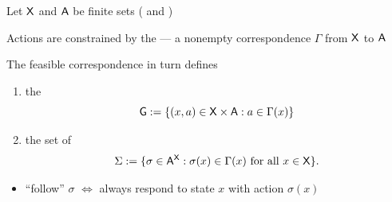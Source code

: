 \begin{frame}
    
    Let $\mathsf X$ and $\mathsf A$ be finite sets ( and )

        \vspace{0.5em}
    Actions are constrained by the  ---
        a nonempty correspondence $\Gamma$ from $\mathsf X$ to $\mathsf A$ 
            

        \vspace{0.5em}

    The feasible correspondence in turn defines
    \begin{enumerate}
        \item the 
            \begin{equation*}
                \mathsf G := \{ (x, a) \in \mathsf X \times \mathsf A : a \in \Gamma(x) \}
            \end{equation*}
        \item the set of  
            \begin{equation*}
                \Sigma := 
                    \{ \sigma \in \mathsf A^\mathsf X : \sigma(x) \in \Gamma(x) \text{ for all } x \in \mathsf X \}.
            \end{equation*}
    \end{enumerate}

    \begin{itemize}
        \item ``follow'' $\sigma$ $\iff$ always respond to state $x$ with action
            $\sigma(x)$
    \end{itemize}

\end{frame}

